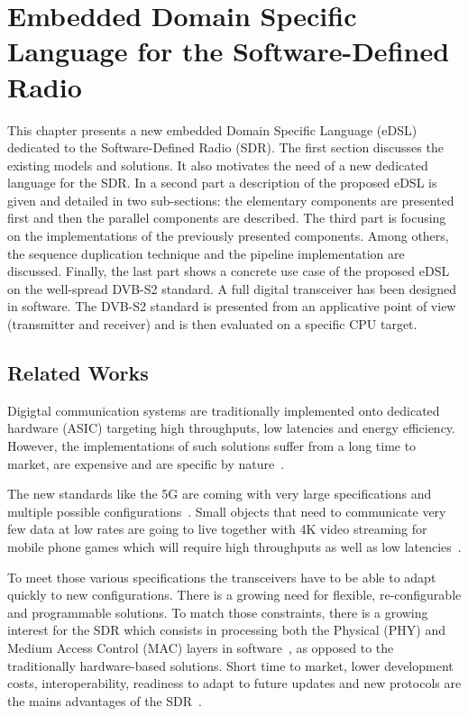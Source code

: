 
\renewcommand{\curChapter}{main/chapter5}

\chapter{Embedded Domain Specific Language for the Software-Defined Radio}
\label{chap:sdr}

This chapter presents a new embedded Domain Specific Language (eDSL) dedicated
to the Software-Defined Radio (SDR). The first section discusses the existing
models and solutions. It also motivates the need of a new dedicated language for
the SDR. In a second part a description of the proposed eDSL is given and
detailed in two sub-sections: the elementary components are presented first and
then the parallel components are described. The third part is focusing on the
implementations of the previously presented components. Among others, the
sequence duplication technique and the pipeline implementation are discussed.
Finally, the last part shows a concrete use case of the proposed eDSL on the
well-spread DVB-S2 standard. A full digital transceiver has been designed in
software. The DVB-S2 standard is presented from an applicative point of view
(transmitter and receiver) and is then evaluated on a specific CPU target.

\vspace*{\fill}
\minitoccustom
\vspace*{\fill}

\section{Related Works}

Digigtal communication systems are traditionally implemented onto dedicated
hardware (ASIC) targeting high throughputs, low latencies and energy efficiency.
However, the implementations of such solutions suffer from a long time to
market, are expensive and are specific by nature~\cite{Palkovic2010,
Palkovic2012}.

The new standards like the 5G are coming with very large specifications and
multiple possible configurations~\cite{ETSI2018}. Small objects that need to
communicate very few data at low rates are going to live together with 4K video
streaming for mobile phone games which will require high throughputs as well as
low latencies~\cite{Rost2014}.

To meet those various specifications the transceivers have to be able to adapt
quickly to new configurations. There is a growing need for flexible,
re-configurable and programmable solutions. To match those constraints, there is
a growing interest for the SDR which consists in processing both the Physical
(PHY) and Medium Access Control (MAC) layers in software~\cite{Mitola1993}, as
opposed to the traditionally hardware-based solutions. Short time to market,
lower development costs, interoperability, readiness to adapt to future updates
and new protocols are the mains advantages of the SDR~\cite{Akeela2018}.

